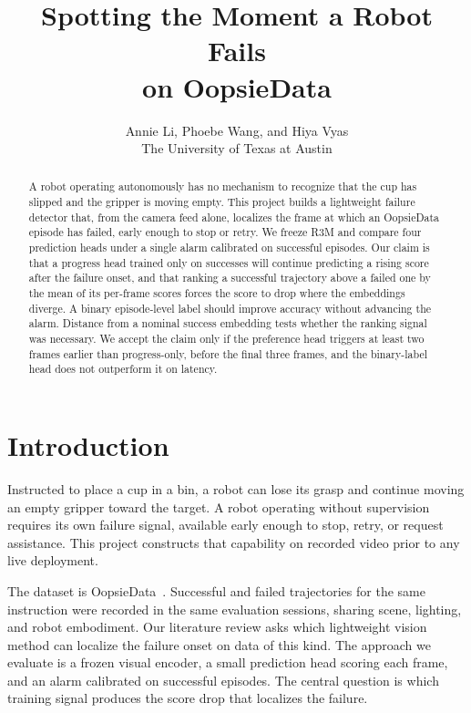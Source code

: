 \documentclass{article}
\title{Spotting the Moment a Robot Fails\\ on OopsieData}
\author{%
  Annie Li, Phoebe Wang, and Hiya Vyas\\
  The University of Texas at Austin
}
\begin{document}
\maketitle

\begin{abstract}
A robot operating autonomously has no mechanism to recognize that the cup has slipped and the gripper is moving empty. This project builds a lightweight failure detector that, from the camera feed alone, localizes the frame at which an OopsieData episode has failed, early enough to stop or retry. We freeze R3M and compare four prediction heads under a single alarm calibrated on successful episodes. Our claim is that a progress head trained only on successes will continue predicting a rising score after the failure onset, and that ranking a successful trajectory above a failed one by the mean of its per-frame scores forces the score to drop where the embeddings diverge. A binary episode-level label should improve accuracy without advancing the alarm. Distance from a nominal success embedding tests whether the ranking signal was necessary. We accept the claim only if the preference head triggers at least two frames earlier than progress-only, before the final three frames, and the binary-label head does not outperform it on latency.
\end{abstract}

\section{Introduction}
Instructed to place a cup in a bin, a robot can lose its grasp and continue moving an empty gripper toward the target. A robot operating without supervision requires its own failure signal, available early enough to stop, retry, or request assistance. This project constructs that capability on recorded video prior to any live deployment.

The dataset is OopsieData~\citep{oopsiedata}. Successful and failed trajectories for the same instruction were recorded in the same evaluation sessions, sharing scene, lighting, and robot embodiment. Our literature review asks which lightweight vision method can localize the failure onset on data of this kind. The approach we evaluate is a frozen visual encoder, a small prediction head scoring each frame, and an alarm calibrated on successful episodes. The central question is which training signal produces the score drop that localizes the failure.
\end{document}

